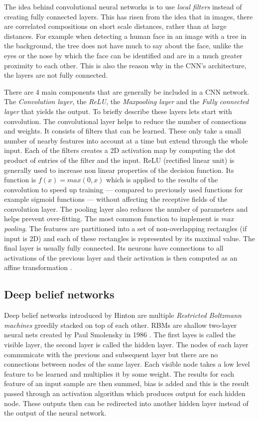The idea behind convolutional neural networks is to use \textit{local filters} instead of creating fully connected layers. This has risen from the idea that in images, there are correlated compositions on short scale distances, rather than at large distances. For example when detecting a human face in an image with a tree in the background, the tree does not have much to say about the face, unlike the eyes or the nose by which the face can be identified and are in a much greater proximity to each other. This is also the reason why in the CNN's architecture, the layers are not fully connected. 

There are 4 main components that are generally be included in a CNN network. The \textit{Convolution layer}, the \textit{ReLU}, the \textit{Maxpooling layer} and the \textit{Fully connected layer} that yields the output. To briefly describe these layers lets start with convolution. The convolutional layer helps to reduce the number of connections and weights. It consists of filters that can be learned. These only take a small number of nearby features into account at a time but extend through the whole input. Each of the filters creates a 2D activation map by computing the dot product of entries of the filter and the input. ReLU (rectified linear unit) is generally used to increase non linear properties of the decision function. Its function is $ f(x) = max(0,x) $ which is applied to the results of the convolution to speed up training --- compared to previously used functions for example sigmoid functions --- without affecting the receptive fields of the convolution layer. The pooling layer also reduces the number of parameters and helps prevent over-fitting. The most common function to implement is \textit{max pooling}. The features are partitioned into a set of non-overlapping rectangles (if input is 2D) and each of these rectangles  is represented by its maximal value. 
The final layer is usually fully connected. Its neurons have connections to all activations of the previous layer and their activation is then computed as an affine transformation \cite{CNN_desription}. 

\subsection{Deep belief networks}
Deep belief networks introduced by Hinton \cite{Hinton504} are multiple \textit{Restricted Boltzmann machines} greedily stacked on top of each other. RBMs are shallow two-layer neural nets created by Paul Smolensky in 1986 \cite{Smolensky1986InformationPI}. The first layes is called the visible layer, the second layer is called the hidden layer. The nodes of each layer communicate with the previous and subsequent layer but there are no connections between nodes of the same layer. Each visible node takes a low level feature to be learned and multiplies it by some weight. The results for each feature of an input sample are then summed, bias is added and this is the result passed through an activation algorithm which produces output for each hidden node. These outputs then can be redirected into another hidden layer instead of the output of the neural network. 

